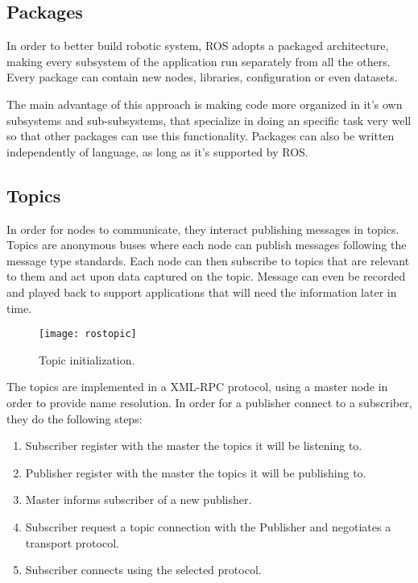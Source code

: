 \subsection{Packages}

In order to better build robotic system, ROS adopts a packaged architecture, making every subsystem of the application run separately from all the others. Every package can contain new nodes, libraries, configuration or even datasets.

The main advantage of this approach is making code more organized in it's own subsystems and sub-subsystems, that specialize in doing an specific task very well so that other packages can use this functionality. Packages can also be written independently of language, as long as it's supported by ROS.

\subsection{Topics}

In order for nodes to communicate, they interact publishing messages in topics. Topics are anonymous buses where each node can publish messages following the message type standards. Each node can then subscribe to topics that are relevant to them and act upon data captured on the topic. Message can even be recorded and played back to support applications that will need the information later in time.

\begin{figure}[!ht]
\centering
\caption{Topic initialization.}
\texttt{[image: rostopic]}
\label{fig:rostopic}
\end{figure}

The topics are implemented in a XML-RPC protocol, using a master node in order to provide name resolution. In order for a publisher connect to a subscriber, they do the following steps:

\begin{enumerate}
\item Subscriber register with the master the topics it will be listening to.
\item Publisher register with the master the topics it will be publishing to.
\item Master informs subscriber of a new publisher.
\item Subscriber request a topic connection with the Publisher and negotiates a transport protocol.
\item Subscriber connects using the selected protocol.
\end{enumerate}

